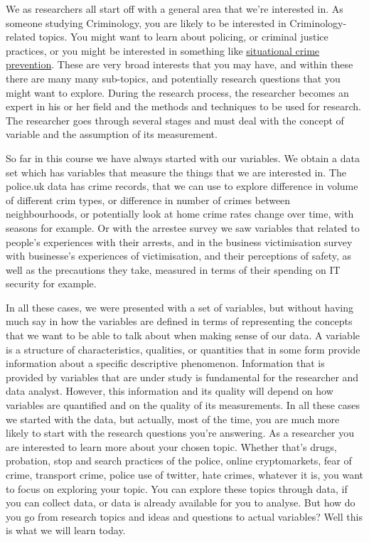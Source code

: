 \documentclass[]{book}
\theoremstyle{definition}
\theoremstyle{definition}
\theoremstyle{definition}
\theoremstyle{remark}
\begin{document}
We as researchers all start off with a general area that we're
interested in. As someone studying Criminology, you are likely to be
interested in Criminology-related topics. You might want to learn about
policing, or criminal justice practices, or you might be interested in
something like
\href{http://criminology.oxfordre.com/view/10.1093/acrefore/9780190264079.001.0001/acrefore-9780190264079-e-3}{situational
crime prevention}. These are very broad interests that you may have, and
within these there are many many sub-topics, and potentially research
questions that you might want to explore. During the research process,
the researcher becomes an expert in his or her field and the methods and
techniques to be used for research. The researcher goes through several
stages and must deal with the concept of variable and the assumption of
its measurement.

So far in this course we have always started with our variables. We
obtain a data set which has variables that measure the things that we
are interested in. The police.uk data has crime records, that we can use
to explore difference in volume of different crim types, or difference
in number of crimes between neighbourhoods, or potentially look at home
crime rates change over time, with seasons for example. Or with the
arrestee survey we saw variables that related to people's experiences
with their arrests, and in the business victimisation survey with
businesse's experiences of victimisation, and their perceptions of
safety, as well as the precautions they take, measured in terms of their
spending on IT security for example.

In all these cases, we were presented with a set of variables, but
without having much say in how the variables are defined in terms of
representing the concepts that we want to be able to talk about when
making sense of our data. A variable is a structure of characteristics,
qualities, or quantities that in some form provide information about a
specific descriptive phenomenon. Information that is provided by
variables that are under study is fundamental for the researcher and
data analyst. However, this information and its quality will depend on
how variables are quantified and on the quality of its measurements. In
all these cases we started with the data, but actually, most of the
time, you are much more likely to start with the research questions
you're answering. As a researcher you are interested to learn more about
your chosen topic. Whether that's drugs, probation, stop and search
practices of the police, online cryptomarkets, fear of crime, transport
crime, police use of twitter, hate crimes, whatever it is, you want to
focus on exploring your topic. You can explore these topics through
data, if you can collect data, or data is already available for you to
analyse. But how do you go from research topics and ideas and questions
to actual variables? Well this is what we will learn today.
\end{document}
